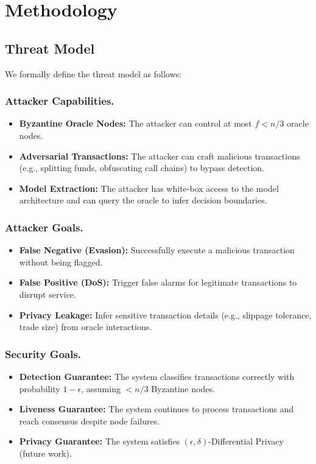 \section{Methodology}

\subsection{Threat Model}
We formally define the threat model as follows:

\subsubsection{Attacker Capabilities.}
\begin{itemize}
    \item \textbf{Byzantine Oracle Nodes:} The attacker can control at most $f < n/3$ oracle nodes.
    \item \textbf{Adversarial Transactions:} The attacker can craft malicious transactions (e.g., splitting funds, obfuscating call chains) to bypass detection.
    \item \textbf{Model Extraction:} The attacker has white-box access to the model architecture and can query the oracle to infer decision boundaries.
\end{itemize}

\subsubsection{Attacker Goals.}
\begin{itemize}
    \item \textbf{False Negative (Evasion):} Successfully execute a malicious transaction without being flagged.
    \item \textbf{False Positive (DoS):} Trigger false alarms for legitimate transactions to disrupt service.
    \item \textbf{Privacy Leakage:} Infer sensitive transaction details (e.g., slippage tolerance, trade size) from oracle interactions.
\end{itemize}

\subsubsection{Security Goals.}
\begin{itemize}
    \item \textbf{Detection Guarantee:} The system classifies transactions correctly with probability $1-\epsilon$, assuming $< n/3$ Byzantine nodes.
    \item \textbf{Liveness Guarantee:} The system continues to process transactions and reach consensus despite node failures.
    \item \textbf{Privacy Guarantee:} The system satisfies $(\epsilon, \delta)$-Differential Privacy (future work).
\end{itemize}

